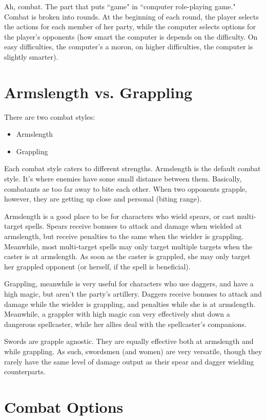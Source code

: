 \documentclass{report}
\begin{document}
Ah, combat. The part that puts ``game" in ``computer role-playing game." Combat
is broken into rounds. At the beginning of each round, the player selects the 
actions for each member of her party, while the computer selects options for the
player's opponents (how smart the computer is depends on the difficulty. On easy
difficulties, the computer's a moron, on higher difficulties, the computer is
slightly smarter).

\section{Armslength vs. Grappling}

There are two combat styles:
\begin{itemize}
    \item Armslength
    \item Grappling
\end{itemize}

Each combat style caters to different strengths. Armslength is the default combat
style. It's where enemies have some small distance between them. Basically, combatants ae too far
away to bite each other. When two opponents grapple, however, they are getting
up close and personal (biting range).

Armslength is a good place to be for characters who wield spears, or cast 
multi-target spells. Spears receive bonuses to attack and damage when wielded at
armslength, but receive penalties to the same when the wielder is grappling. 
Meanwhile, most multi-target spells may only target multiple targets when the 
caster is at armslength. As soon as the caster is grappled, she may only target
her grappled opponent (or herself, if the spell is beneficial).

Grappling, meanwhile is very useful for characters who use daggers, and have a 
high magic, but aren't the party's artillery. Daggers receive bonuses to attack
and damage while the wielder is grappling, and penalties while she is at
armslength. Meanwhile, a grappler with high magic can very effectively shut down
a dangerous spellcaster, while her allies deal with the spellcaster's companions.

Swords are grapple agnostic. They are equally effective both at armslength and
while grappling. As such, swordsmen (and women) are very versatile, though they rarely have the 
same level of damage output as their spear and dagger wielding counterparts.

\section{Combat Options}
\end{document}

